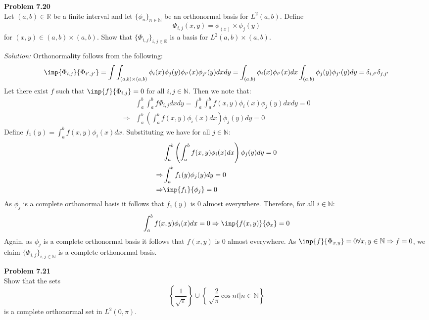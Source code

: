 \documentclass[a4paper, 11pt]{article}
\newenvironment{problem}[2][Problem]
    { \begin{mdframed}[backgroundcolor=gray!20] \textbf{#1 #2} \\}
    {  \end{mdframed}}
\newenvironment{solution}
    {\textit{Solution:}}
    {}
\begin{document}
\begin{problem}{7.20}
    Let $(a,b)\in\mathbb R$ be a finite interval and let $\{\phi_n\}_{n\in\mathbb N}$ be an orthonormal basis for $L^2(a,b)$. Define
    $$\Phi_{i,j}(x,y)=\phi_(x)\times\phi_j(y)$$
    for $(x,y)\in(a,b)\times(a,b)$. Show that $\{\Phi_{i,j}\}_{i,j\in\mathbb{R}}$ is a basis for $L^2(a,b)\times(a,b)$.
\end{problem}
\begin{solution}
    Orthonormality follows from the following:
    $$\inp{\Phi_{i,j}}{\Phi_{i',j'}}=\int\int_{(a,b)\times(a,b)}\phi_i(x)\phi_j(y)\phi_{i'}(x)\phi_{j'}(y)dxdy=\int_{(a,b)}\phi_{i}(x)\phi_{i'}(x)dx\int_{(a,b)}\phi_{j}(y)\phi_{j'}(y)dy=\delta_{i,i'}\delta_{j,j'}$$
    Let there exist $f$ such that $\inp{f}{\Phi_{i,j}}=0$ for all $i,j\in\mathbb  N$. Then we note that:
    \begin{align*}
        &\int_a^b\int_a^bf\Phi_{i,j}dxdy=\int_a^b\int_a^bf(x,y)\phi_{i}(x)\phi_j(y)dxdy=0\\
        \Rightarrow&\int_a^b\left(\int_a^bf(x,y)\phi_{i}(x)dx\right)\phi_j(y)dy=0
    \end{align*}
    Define $f_1(y)=\int_a^bf(x,y)\phi_{i}(x)dx$. Substituting we have for all $j\in\mathbb N$:
    \begin{align*}
        &\int_a^b\left(\int_a^bf(x,y)\phi_{i}(x)dx\right)\phi_j(y)dy=0\\
        \Rightarrow&\int_a^bf_1(y)\phi_j(y)dy=0\\
        \Rightarrow&\inp{f_1}{\phi_j}=0
    \end{align*}
    As $\phi_j$ is a complete orthonormal basis it follows that $f_1(y)$ is $0$ almost everywhere. Therefore, for all $i\in\mathbb{N}$:
    \begin{align*}
        \int_a^bf(x,y)\phi_{i}(x)dx=0\Rightarrow \inp{f(x,y)}{\phi_{x}}=0
    \end{align*}
    Again, as $\phi_j$ is a complete orthonormal basis it follows that $f(x,y)$ is $0$ almost everywhere. As $\inp{f}{\Phi_{x,y}}=0\forall x,y\in\mathbb{N}\Rightarrow f=0$, we claim $\{\Phi_{i,j}\}_{i,j\in\mathbb{N}}$ is a complete orthonormal basis. 
\end{solution}
\begin{problem}{7.21}
Show that the sets 
$$\left\{\frac{1}{\sqrt{\pi}}\right\}\cup \left\{\sqrt\frac{2}{{\pi}}\cos nt|n\in\mathbb N\right\}$$    
is a complete orthonormal set in $L^2(0,\pi)$.
\end{problem}
\end{document}
